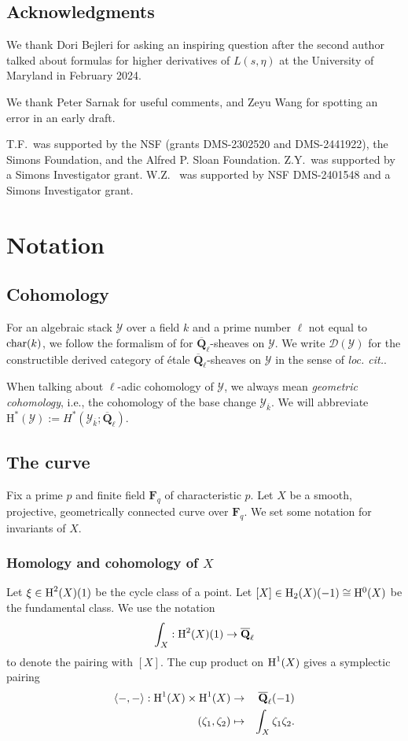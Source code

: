 \documentclass[reqno]{amsart}
\numberwithin{equation}{subsection}
\theoremstyle{definition}
\newcommand\cD{\mathcal{D}}
\newcommand\cY{\mathcal{Y}}
\newcommand{\ch}{\textup{char}}
\newcommand{\Qlbar}{\overline{\Q}_\ell}
\renewcommand{\j}[1]{\langle{#1}\rangle}
\newcommand{\ov}{\overline}
\newcommand{\homog}[2]{\textup{H}_{#1}({#2})}  %
\newcommand{\cohog}[2]{\textup{H}^{#1}({#2})}     %
\newcommand\mt{\mapsto}
\newcommand{\z}{\zeta}
\newcommand{\F}{\mathbf{F}}
\newcommand{\Q}{\mathbf{Q}}
\newcommand{\ol}[1]{\overline{#1}}
\newcommand{\rH}{\ensuremath{\mathrm{H}}\xspace}
\begin{document}
\subsection*{Acknowledgments}
We thank Dori Bejleri for asking an inspiring question after the second author talked about formulas for higher derivatives of $L(s,\eta)$ at the University of Maryland in February 2024.

We thank Peter Sarnak for useful comments, and Zeyu Wang for spotting an error in an early draft.


T.F.~was supported by the NSF (grants DMS-2302520 and DMS-2441922), the Simons Foundation, and the Alfred P. Sloan Foundation. Z.Y.~was supported by a Simons Investigator grant. W.Z. ~was supported by NSF DMS-2401548 and a Simons Investigator grant.


\section{Notation}  

\subsection{Cohomology}For an algebraic stack $\cY$ over a field $k$ and a prime number $\ell$ not equal to $\ch(k)$, we follow the formalism of \cite{LiuZheng} for $\ol \Q_\ell$-sheaves on $\cY$. We write $\cD(\cY)$ for the constructible derived category of \'etale $\ol \Q_\ell$-sheaves on $\cY$ in the sense of \emph{loc. cit.}.

When talking about $\ell$-adic cohomology of $\cY$, we always mean \emph{geometric cohomology}, i.e., the cohomology of the base change $\cY_{\ov k}$. We will abbreviate $\rH^*(\cY) := H^*(\cY_{\ol k}; \ol\Q_\ell)$. 

\subsection{The curve} Fix a prime $p$ and finite field $\F_q$ of characteristic $p$. Let $X$ be a smooth, projective, geometrically connected curve over $\F_q$. We set some notation for invariants of $X$. 

\subsubsection{Homology and cohomology of $X$}
Let $\xi\in \cohog{2}{X}(1)$ be the cycle class of a point. Let $[X]\in \homog{2}{X}(-1) \cong \rH^0(X)$ be the fundamental class. We use the notation
\begin{equation*}
\int_{X}: \cohog{2}{X}(1)\to \Qlbar
\end{equation*}
to denote the pairing with $[X]$. The cup product on $\cohog{1}{X}$ gives a symplectic pairing 
\begin{eqnarray*}
\j{-,-}: \cohog{1}{X}\times \cohog{1}{X}&\to& \Qlbar(-1)\\
(\z_{1}, \z_{2})&\mt& \int_{X}\z_{1}\z_{2}. 
\end{eqnarray*}
\end{document}
